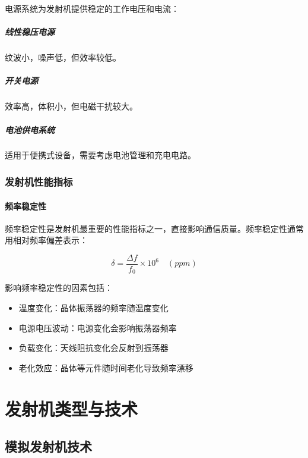 \documentclass[12pt,UTF8]{ctexbook}
\begin{document}
电源系统为发射机提供稳定的工作电压和电流：

\subsubsection{线性稳压电源}
纹波小，噪声低，但效率较低。

\subsubsection{开关电源}
效率高，体积小，但电磁干扰较大。

\subsubsection{电池供电系统}
适用于便携式设备，需要考虑电池管理和充电电路。

\section{发射机性能指标}

\subsection{频率稳定性}

频率稳定性是发射机最重要的性能指标之一，直接影响通信质量。频率稳定性通常用相对频率偏差表示：

\begin{equation}
\delta = \frac{\Delta f}{f_0} \times 10^6 \quad (ppm)
\end{equation}

影响频率稳定性的因素包括：
\begin{itemize}[leftmargin=3.5em]
    \item 温度变化：晶体振荡器的频率随温度变化
    \item 电源电压波动：电源变化会影响振荡器频率
    \item 负载变化：天线阻抗变化会反射到振荡器
    \item 老化效应：晶体等元件随时间老化导致频率漂移
\end{itemize}

\part{发射机类型与技术}

\chapter{模拟发射机技术}
\end{document}
